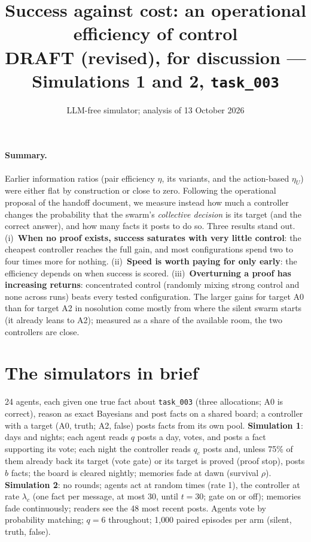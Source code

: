 \documentclass[10pt,a4paper]{article}
\title{\vspace{-1.2cm}\textbf{Success against cost: an operational efficiency of control}\\[2pt]
\large DRAFT (revised), for discussion --- Simulations 1 and 2, \texttt{task\_003}}
\author{LLM-free simulator; analysis of 13 October 2026}
\date{}
\begin{document}
\maketitle
\vspace{-1cm}

\paragraph{Summary.} Earlier information ratios (pair efficiency $\eta$, its variants, and the
action-based $\eta_U$) were either flat by construction or close to zero. Following the
operational proposal of the handoff document, we measure instead how much a controller changes the
probability that the swarm's \emph{collective decision} is its target (and the correct answer), and how
many facts it posts to do so. Three results stand out. (i)~\textbf{When no proof exists, success saturates
with very little control}: the cheapest controller reaches the full gain, and most configurations spend
two to four times more for nothing. (ii)~\textbf{Speed is worth paying for only early}: the efficiency
depends on when success is scored. (iii)~\textbf{Overturning a proof has increasing returns}: concentrated
control (randomly mixing strong control and none across runs) beats every tested configuration. The
larger gains for target A0 than for target A2 in nosolution come mostly from where the silent swarm
starts (it already leans to A2); measured as a share of the available room, the two controllers are
close.

\section{The simulators in brief}

24 agents, each given one true fact about \texttt{task\_003} (three allocations; A0 is correct), reason as
exact Bayesians and post facts on a shared board; a controller with a target (A0, truth; A2, false) posts
facts from its own pool. \textbf{Simulation 1}: days and nights; each agent reads $q$ posts a day, votes, and
posts a fact supporting its vote; each night the controller reads $q_c$ posts and, unless 75\% of them
already back its target (vote gate) or its target is proved (proof stop), posts $b$ facts; the board is
cleared nightly; memories fade at dawn (survival $\rho$). \textbf{Simulation 2}: no rounds; agents act at
random times (rate 1), the controller at rate $\lambda_c$ (one fact per message, at most 30, until
$t = 30$; gate on or off); memories fade continuously; readers see the 48 most recent posts. Agents
vote by probability matching; $q = 6$ throughout; 1{,}000 paired episodes per arm (silent, truth, false).
\end{document}
